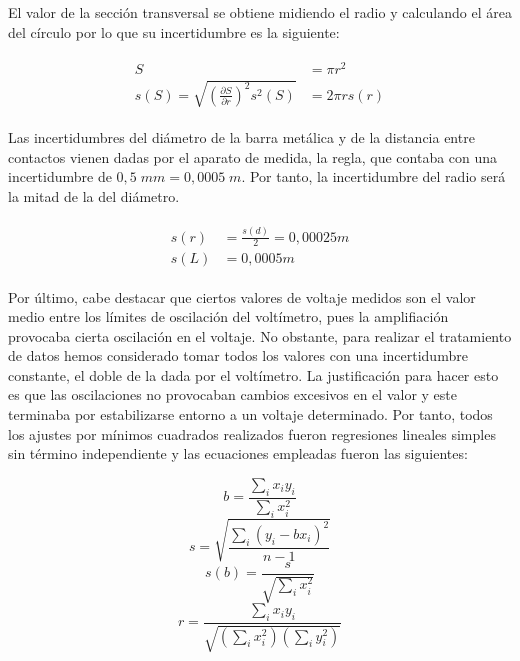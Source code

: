 \documentclass[a4paper,12pt,titlepage]{article}
\begin{document}
El valor de la sección transversal se obtiene midiendo el radio y calculando el área del círculo por lo que su incertidumbre es la siguiente:

\begin{align}
    \begin{split}
    S &= \pi r^2 \\
    s(S) = \sqrt{\left (\frac{\partial S}{\partial r}\right )^2s^2(S)} &= 2\pi r s(r)
    \end{split}
    \label{Inc sección}
\end{align}

\newpage

Las incertidumbres del diámetro de la barra metálica y de la distancia entre contactos vienen dadas por el aparato de medida, la regla, que contaba con una incertidumbre de $0,5 \; mm = 0,0005 \; m$. Por tanto, la incertidumbre del radio será la mitad de la del diámetro.

\begin{align}
    \begin{split}
        s(r) &=\frac{s(d)}{2}= 0,00025 m  \\
        s(L) &= 0,0005 m
    \end{split}
\end{align}

Por último, cabe destacar que ciertos valores de voltaje medidos son el valor medio entre los límites de oscilación del voltímetro, pues la amplifiación provocaba cierta oscilación en el voltaje. No obstante, para realizar el tratamiento de datos hemos considerado tomar todos los valores con una incertidumbre constante, el doble de la dada por el voltímetro. La justificación para hacer esto es que las oscilaciones no provocaban cambios excesivos en el valor y este terminaba por estabilizarse entorno a un voltaje determinado. Por tanto, todos los ajustes por mínimos cuadrados realizados fueron regresiones lineales simples sin término independiente y las ecuaciones empleadas fueron las siguientes:

\begin{equation}
    b=\frac{\sum_{i}x_{i}y_{i}}{\sum_{i}x_{i}^2}
\end{equation}
\begin{equation}
    s=\sqrt{\frac{\sum_{i}(y_{i}-bx_{i})^2}{n-1}}
\end{equation}
\begin{equation}
    s(b)=\frac{s}{\sqrt{\sum_{i}x_{i}^2}}
\end{equation}
\begin{equation}
    r=\frac{\sum_{i}x_{i}y_{i}}{\sqrt{(\sum_{i}x_{i}^2)(\sum_{i}y_{i}^2)}}
\end{equation}
\end{document}
